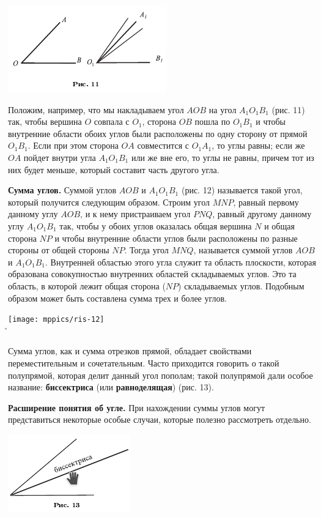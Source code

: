 \documentclass[oneside]{book}
\begin{document}
\includegraphics{pics/ris-11}

Положим, например, что мы накладываем угол $AOB$ на угол $A_1O_1B_1$ (рис. 11) так, чтобы вершина $O$ совпала с $O_1$, сторона $OB$ пошла по $O_1B_1$ и чтобы внутренние области обоих углов были расположены по одну сторону от прямой $O_1B_1$.
Если при этом сторона $OA$ совместится с $O_1A_1$, то углы равны;
если же $OA$ пойдет внутри угла $A_1O_1B_1$ или же вне его, то углы не равны, причем тот из них будет меньше, который составит часть другого угла.

\textbf{Сумма углов.}
Суммой углов $AOB$ и $A_1O_1B_1$ (рис. 12) называется такой угол, который получится следующим образом.
Строим угол $MNP$, равный первому данному углу $AOB$, и к нему пристраиваем угол $PNQ$, равный другому данному углу $A_1O_1B_1$ так, чтобы у обоих углов оказалась общая вершина $N$ и общая сторона $NP$ и чтобы внутренние области углов были расположены по разные стороны от общей стороны $NP$.
Тогда угол $MNQ$, называется суммой углов $AOB$ и $A_1O_1B_1$.
Внутренней областью этого угла служит та область плоскости, которая образована совокупностью внутренних областей складываемых углов.
Это та область, в которой лежит общая сторона ($NP$) складываемых углов.
Подобным образом может быть составлена сумма трех и более углов.

\begin{center}
	\texttt{[image: mppics/ris-12]}\\
	\r
\end{center}

Сумма углов, как и сумма отрезков прямой, обладает свойствами переместительным и сочетательным.
Часто приходится говорить о такой полупрямой, которая делит данный угол пополам;
такой полупрямой дали особое название:
\textbf{биссектриса} (или \textbf{равноделящая}) (рис. 13).


\textbf{Расширение понятия об угле.}
При нахождении суммы углов могут представиться некоторые особые случаи, которые полезно рассмотреть отдельно.

\includegraphics{pics/ris-13}
\end{document}
